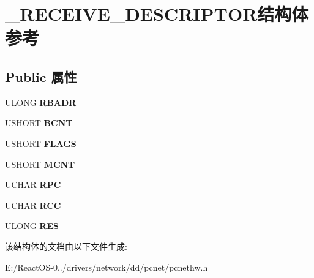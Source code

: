\hypertarget{struct___r_e_c_e_i_v_e___d_e_s_c_r_i_p_t_o_r}{}\section{\+\_\+\+R\+E\+C\+E\+I\+V\+E\+\_\+\+D\+E\+S\+C\+R\+I\+P\+T\+O\+R结构体 参考}
\label{struct___r_e_c_e_i_v_e___d_e_s_c_r_i_p_t_o_r}
\subsection*{Public 属性}
\begin{DoxyCompactItemize}
\item 
\mbox{\label{struct___r_e_c_e_i_v_e___d_e_s_c_r_i_p_t_o_r_a8daa24487de93366a25afeba6b0508ac}} 
U\+L\+O\+NG {\bfseries R\+B\+A\+DR}
\item 
\mbox{\label{struct___r_e_c_e_i_v_e___d_e_s_c_r_i_p_t_o_r_af0e545f9c17310a6c4928bf7029a8c31}} 
U\+S\+H\+O\+RT {\bfseries B\+C\+NT}
\item 
\mbox{\label{struct___r_e_c_e_i_v_e___d_e_s_c_r_i_p_t_o_r_ae77f3637b11b833499526d7dc7c820d4}} 
U\+S\+H\+O\+RT {\bfseries F\+L\+A\+GS}
\item 
\mbox{\label{struct___r_e_c_e_i_v_e___d_e_s_c_r_i_p_t_o_r_a6db8902e577947e511da9b83fa8bedcb}} 
U\+S\+H\+O\+RT {\bfseries M\+C\+NT}
\item 
\mbox{\label{struct___r_e_c_e_i_v_e___d_e_s_c_r_i_p_t_o_r_a074db400819e164706fcc70a76d8ad92}} 
U\+C\+H\+AR {\bfseries R\+PC}
\item 
\mbox{\label{struct___r_e_c_e_i_v_e___d_e_s_c_r_i_p_t_o_r_accdbe6a7772c48bdd8f3aab9d6e85729}} 
U\+C\+H\+AR {\bfseries R\+CC}
\item 
\mbox{\label{struct___r_e_c_e_i_v_e___d_e_s_c_r_i_p_t_o_r_a8d1187e70ff5a513bfc68b30900dc58c}} 
U\+L\+O\+NG {\bfseries R\+ES}
\end{DoxyCompactItemize}


该结构体的文档由以下文件生成\+:\begin{DoxyCompactItemize}
\item 
E\+:/\+React\+O\+S-\/0../drivers/network/dd/pcnet/pcnethw.\+h\end{DoxyCompactItemize}
